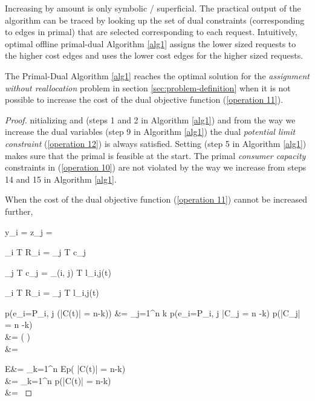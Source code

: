 \documentclass{llncs}
\begin{document}
Increasing  by amount  is only symbolic / superficial. The practical output of the algorithm can be traced by looking up the set of dual constraints (corresponding to edges in primal) that are selected corresponding to each request. Intuitively, optimal offline primal-dual Algorithm \ref{alg1} assigns the lower sized requests to the higher cost edges and uses the lower cost edges for the higher sized requests.

\begin{theorem}   The Primal-Dual Algorithm \ref{alg1} reaches the optimal solution for the \emph{assignment without reallocation} problem in section \ref{sec:problem-definition} when it is not possible to increase the cost of the dual objective function (\ref{operation 11}).
\end{theorem}
\begin{proof}
nitializing  and  (steps 1 and 2 in Algorithm \ref{alg1}) and from the way we increase the dual variables (step 9 in Algorithm \ref{alg1}) the dual \emph{potential limit constraint} (\ref{operation 12}) is always satisfied. Setting  (step 5 in Algorithm \ref{alg1}) makes sure that the primal is feasible at the start. The primal \emph{consumer capacity} constraints in (\ref{operation 10}) are not violated by the way we increase  from steps 14 and 15 in Algorithm \ref{alg1}.

When the cost of the dual objective function (\ref{operation 11}) cannot be increased further,


\Delta y_i = \Delta z_j = \Delta
\label{operation 200}

\sum_{i \in T}  R_i = \sum_{j \in T}  c_j
\label{operation 19}

\sum_{j \in T} c_j = \sum_{(i, j) \in T} l_{i,j}(t)
\label{operation 20}

\sum_{i \in T}  R_i = \sum_{j \in T} l_{i,j}(t)
\label{operation 37}

p\Big(e_{i=P_i, j} \bigm\vert (|C(t)| = n-k)\Big)   &= \sum_{j=1}^{{n \choose k}} p\Big(e_{i=P_i, j}  \bigm\vert |C_j = n -k\Big) \cdot p\Big(|C_j| = n -k\Big) \\
&=  \Bigg(  \Bigg) \\
&= 
\label{operation 900}

E\Big[d_{i=P_i,j} \bigm\vert P_{i}\Big]  &= \sum_{k=1}^{n} E\Big[d_{i=P_i, j}  \bigm\vert (|C(t)| = n-k)\Big] \cdot p\Big( |C(t)| = n-k\Big) \\
&=  \cdot \sum_{k=1}^{n} p\Big(|C(t)| = n-k\Big) \\
&= 
\label{operation 115}


\end{proof}
\end{document}
